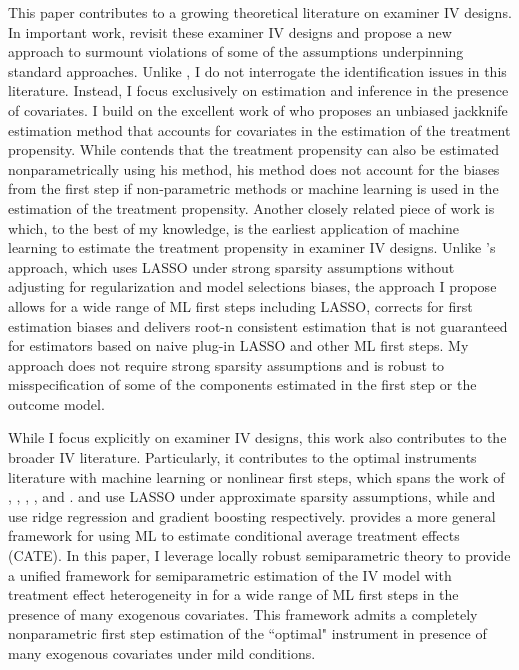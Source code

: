 This paper contributes to a growing theoretical literature on examiner IV designs. In important work, \citet{frandsen2023judging} revisit these examiner IV designs and propose a new approach to surmount violations of some of the assumptions underpinning standard approaches. Unlike \citet{frandsen2023judging}, I do not interrogate the identification issues in this literature. Instead, I focus exclusively on estimation and inference in the presence of covariates. I build on the excellent work of \citet{kolesarcowles} who proposes an unbiased jackknife estimation method that accounts for covariates in the estimation of the treatment propensity. While \citet{kolesarcowles} contends that the treatment propensity can also be estimated nonparametrically using his method, his method does not account for the biases from the first step if non-parametric methods or machine learning is used in the estimation of the treatment propensity. Another closely related piece of work is \citet{mueller2015criminal} which, to the best of my knowledge, is the earliest application of machine learning to estimate the treatment propensity in examiner IV designs. Unlike \citet{mueller2015criminal}'s approach, which uses LASSO under strong sparsity assumptions without adjusting for regularization and model selections biases, the approach I propose allows for a wide range of ML first steps including LASSO, corrects for first estimation biases and delivers root-n consistent estimation that is not guaranteed for estimators based on naive plug-in LASSO and other ML first steps. My approach does not require strong sparsity assumptions and is robust to misspecification of some of the components estimated in the first step or the outcome model. 

While I focus explicitly on examiner IV designs, this work also contributes to the broader IV literature. Particularly, it contributes to the optimal instruments literature with machine learning or nonlinear first steps, which spans the work of \citet{belloni2012sparse}, \citet{HANSEN2014290}, \citet{chernuzhukov2015}, \citet{syrgkanis2019machine}, and \citet{bai2010instrumental}. \citet{belloni2012sparse} and \citet{chernuzhukov2015} use LASSO under approximate sparsity assumptions, while \citet{HANSEN2014290} and \citet{bai2010instrumental} use ridge regression and gradient boosting respectively. \citet{syrgkanis2019machine} provides a more general framework for using ML to estimate conditional average treatment effects (CATE).  In this paper, I leverage locally robust semiparametric theory to provide a unified framework for semiparametric estimation of the IV model with treatment effect heterogeneity in \citet{kolesarcowles} for a wide range of ML first steps in the presence of many exogenous covariates. This framework admits a completely nonparametric first step estimation of the ``optimal" instrument in presence of many exogenous covariates under mild conditions.

